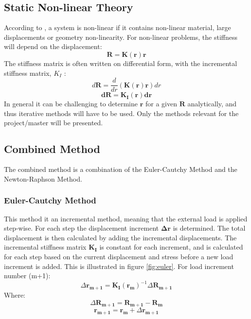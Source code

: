 \subsection{Static Non-linear Theory}
According to \cite{moan2003}, a system is non-linear if it contains non-linear material, large displacements or geometry non-linearity. For non-linear problems, the stiffness will depend on the displacement:
\begin{equation}
    \boldsymbol{R}=\boldsymbol{K(r)}\boldsymbol{r}
\end{equation}
The stiffness matrix is often written on differential form, with the incremental stiffness matrix, $K_I$ :
\begin{equation}
    d\boldsymbol{R}=\frac{d}{dr}(\boldsymbol{K(r)r})dr
\end{equation}
\begin{equation}
  \boldsymbol{dR}= \boldsymbol{K_I(r)}\boldsymbol{dr}
  \label{eq:system}
\end{equation}
In general it can be challenging to determine $\boldsymbol{r}$ for a given $\boldsymbol{R}$ analytically, and thus iterative methods will have to be used. Only the methods relevant for the project/master will be presented. 

\subsection{Combined Method}
The combined method is a combination of the Euler-Cautchy Method and the Newton-Raphson Method. 
\subsubsection{Euler-Cautchy Method}
This method it an incremental method, meaning that the external load is applied step-wise. For each step the displacement increment $\boldsymbol{\Delta r}$ is determined. The total displacement is then calculated by adding the incremental displacements. The incremental stiffness matrix $\boldsymbol{K_I}$ is constant for each increment, and is calculated for each step based on the current displacement and stress before a new load increment is added. This is illustrated in figure \ref{fig:euler}. For load increment number (m+1):
\begin{equation}
\Delta \boldsymbol{r_{m+1}}= \boldsymbol{K_{I}}(\boldsymbol{r_{m}})^{-1} \Delta \boldsymbol{R_{m+1}}
\end{equation}
Where:
\begin{equation}
    \Delta \boldsymbol{R_{m+1}} = \boldsymbol{R_{m+1}} - \boldsymbol{R_{m}}
\end{equation}
\begin{equation}
    \boldsymbol{r_{m+1}}=\boldsymbol{r_{m}}+\Delta \boldsymbol{r_{m+1}}
\end{equation}

